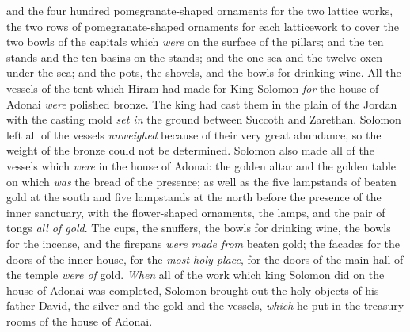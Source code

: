 \begin{biblechapter}
\verse and the four hundred pomegranate-shaped ornaments for the two lattice works, the two rows of pomegranate-shaped ornaments for each latticework to cover the two bowls of the capitals which \textit{were} on the surface of the pillars;
\verse and the ten stands and the ten basins on the stands;
\verse and the one sea and the twelve oxen under the sea;
\verse and the pots, the shovels, and the bowls for drinking wine. All the vessels of the tent which Hiram had made for King Solomon \textit{for} the house of Adonai \textit{were} polished bronze.
\verse The king had cast them in the plain of the Jordan with the casting mold \textit{set in} the ground between Succoth and Zarethan.
\verse Solomon left all of the vessels \textit{unweighed} because of their very great abundance, so the weight of the bronze could not be determined.
\verse Solomon also made all of the vessels which \textit{were} in the house of Adonai: the golden altar and the golden table on which \textit{was} the bread of the presence;
\verse as well as the five lampstands of beaten gold at the south and five lampstands at the north before the presence of the inner sanctuary, with the flower-shaped ornaments, the lamps, and the pair of tongs \textit{all of gold}.
\verse The cups, the snuffers, the bowls for drinking wine, the bowls for the incense, and the firepans \textit{were made from} beaten gold; the facades for the doors of the inner house, for the \textit{most holy place}, for the doors of the main hall of the temple \textit{were of} gold.
\verse \textit{When} all of the work which king Solomon did on the house of Adonai was completed, Solomon brought out the holy objects of his father David, the silver and the gold and the vessels, \textit{which} he put in the treasury rooms of the house of Adonai.
\end{biblechapter}

